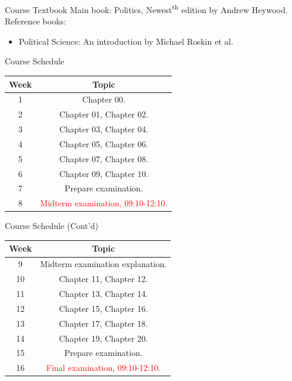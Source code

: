 \documentclass{beamer}
\begin{document}
\begin{frame}{Course Textbook}
\pause
Main book: Politics, Newest\textsuperscript{th} edition by Andrew Heywood. \\
\pause
Reference books:
\begin{itemize}
\item Political Science: An introduction by Michael Roskin et al.
\end{itemize}
\end{frame}
\begin{frame}{Course Schedule}
\begin{center}
\begin{tabular}{|c|c|}
\hline
Week & Topic \\
\hline
1 & Chapter 00.\\
\hline
2 & Chapter 01, Chapter 02.\\
\hline
3 & Chapter 03, Chapter 04.\\
\hline
4 & Chapter 05, Chapter 06.\\
\hline
5 & Chapter 07, Chapter 08.\\
\hline
6 & Chapter 09, Chapter 10.\\
\hline
7 & Prepare examination.\\
\hline
8 & \textcolor{red}{Midterm examination, 09:10-12:10.}\\
\hline
\end{tabular}
\end{center}
\end{frame}
\begin{frame}{Course Schedule (Cont'd)}
\begin{center}
\begin{tabular}{|c|c|}
\hline
Week & Topic \\
\hline
9 & Midterm examination explanation.\\
\hline
10 & Chapter 11, Chapter 12.\\
\hline
11 & Chapter 13, Chapter 14.\\
\hline
12 & Chapter 15, Chapter 16.\\
\hline
13 & Chapter 17, Chapter 18.\\
\hline
14 & Chapter 19, Chapter 20.\\
\hline
15 & Prepare examination.\\
\hline
16 & \textcolor{red}{Final examination, 09:10-12:10.}\\
\hline
\end{tabular}
\end{center}
\end{frame}
\end{document}
